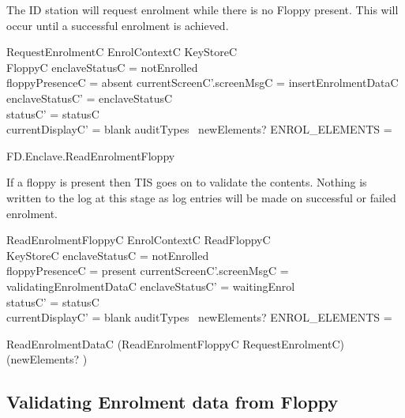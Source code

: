 The ID station will request enrolment while there is no Floppy
present. This will occur until a successful enrolment is achieved.

\begin{schema}{RequestEnrolmentC}
        EnrolContextC
\also
        \Xi KeyStoreC
\\      \Xi FloppyC
\where
        enclaveStatusC = notEnrolled
\\      floppyPresenceC = absent
\also
        currentScreenC'.screenMsgC = insertEnrolmentDataC
\also
        enclaveStatusC' = enclaveStatusC
\\      statusC' = statusC
\\      currentDisplayC' = blank
\also
        auditTypes~ newElements? \cap ENROL\_ELEMENTS = \emptyset
\end{schema}


\begin{traceunit}{FD.Enclave.ReadEnrolmentFloppy}
\end{traceunit}

If a floppy is present then TIS goes on to validate the
contents. Nothing is written to the log at this stage as log entries
will be made on successful or failed enrolment.

\begin{schema}{ReadEnrolmentFloppyC}
        EnrolContextC
\also
        ReadFloppyC
\\      \Xi KeyStoreC
\where
        enclaveStatusC = notEnrolled
\\      floppyPresenceC = present
\also
        currentScreenC'.screenMsgC = validatingEnrolmentDataC 
\also
        enclaveStatusC' = waitingEnrol     
\\      statusC' = statusC
\\      currentDisplayC' = blank                         
\also
        auditTypes~ newElements? \cap ENROL\_ELEMENTS = \emptyset
\end{schema}

\begin{zed}
        ReadEnrolmentDataC  (ReadEnrolmentFloppyC \lor
        RequestEnrolmentC) \hide (newElements? )
\end{zed}

\subsection{Validating Enrolment data from Floppy}

